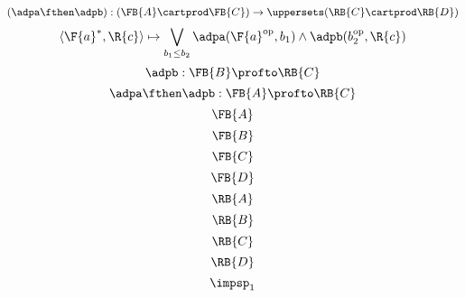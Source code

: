 {\begin{forslides}
\begin{equation}
            \label{eq:adpM12us}
            (\adpa\fthen\adpb):(\FB{A} \cartprod \FB{C})  \to\uppersets (\RB{C} \cartprod \RB{D})
        \end{equation}
        \begin{equation}
            \label{eq:adp12pfexpr}
            \langle\F{a}^*, \R{c}\rangle \mapsto \bigvee_{b_1\leq b_2} \adpa(\F{a}^{\text{op}}, b_1) \wedge \adpb(b_2^{\text{op}}, \R{c})
        \end{equation}
        \begin{equation}
            \label{eq:adp2}
            \adpb: \FB{B} \profto  \RB{C}
        \end{equation}
        \begin{equation}
            \label{eq:adp1adp2}
            \adpa\fthen\adpb: \FB{A} \profto  \RB{C}
        \end{equation}
        \begin{equation}
            \label{eq:FA}
            \FB{A}
        \end{equation}
        \begin{equation}
            \label{eq:FB}
            \FB{B}
        \end{equation}
        \begin{equation}
            \label{eq:FC}
            \FB{C}
        \end{equation}
        \begin{equation}
            \label{eq:FD}
            \FB{D}
        \end{equation}
        \begin{equation}
            \label{eq:RA}
            \RB{A}
        \end{equation}
        \begin{equation}
            \label{eq:RB}
            \RB{B}
        \end{equation}
        \begin{equation}
            \label{eq:RC}
            \RB{C}
        \end{equation}
        \begin{equation}
            \label{eq:RD}
            \RB{D}
        \end{equation}
        \begin{equation}
            \label{eq:impsp1}
            \impsp_1
        \end{equation}
        \begin{equation}
            \label{eq:impsp2}

\end{equation}
\end{forslides}}
